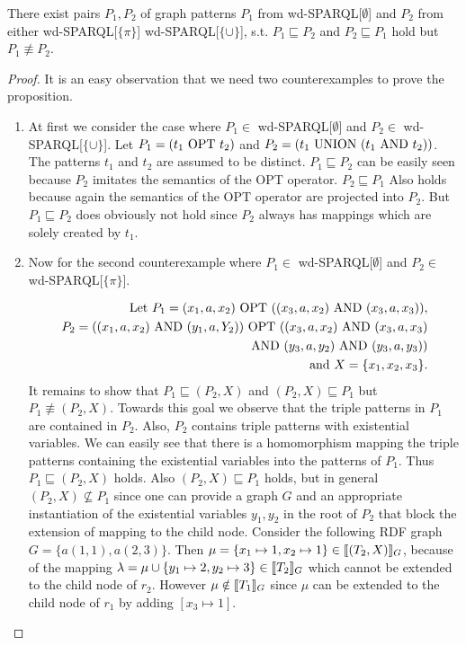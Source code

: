 \begin{proposition}
	There exist pairs $P_1,P_2$ of graph patterns $P_1$ from
	wd-SPARQL[$\emptyset$] and $P_2$ from either wd-SPARQL[$\{\pi\}$]
	wd-SPARQL[$\{\cup\}$], s.t. $P_1 \sqsubseteq P_2$ and $P_2 \sqsubseteq P_1$
	hold but $P_1 \not\equiv P_2$.
\end{proposition}

\begin{proof}
	It is an easy observation that we need two counterexamples to prove the
	proposition. 
	\begin{enumerate}	
		\item At first we consider the case where  $P_1 \in$
			wd-SPARQL[$\emptyset$] and  $P_2 \in$ wd-SPARQL[$\{\cup\}$]. Let
			$P_1 = (t_1 \mbox{ OPT } t_2)$ and $P_2 = (t_1 \mbox{ UNION } (t_1 \mbox{ AND } t_2))$. The patterns $t_1$ and $t_2$
			are assumed to be distinct.
			$P_1 \sqsubseteq P_2$ can be easily seen because $P_2$ imitates
			the semantics of the OPT operator. $P_2 \sqsubseteq P_1$ Also holds because again the
			semantics of the OPT operator are projected into $P_2$. But $P_1 \sqsubseteq P_2$ does
			obviously not hold since $P_2$ always has mappings which are solely created by
			$t_1$.		\item Now for the second counterexample where  $P_1 \in$
			wd-SPARQL[$\emptyset$] and  $P_2 \in$ wd-SPARQL[$\{\pi\}$]. 

			\begin{align*}
				\mbox{Let } P_1 = (x_1,a,x_2) \mbox{ OPT } ((x_3,a,x_2) \mbox{ AND } (x_3,a,x_3)),\\
			P_2 = ((x_1,a,x_2) \mbox{ AND } (y_1,a,Y_2)) \mbox{ OPT } ((x_3,a,x_2) \mbox{ AND }
			(x_3,a,x_3)\\ 
			\mbox{ AND } (y_3,a,y_2) \mbox{ AND } (y_3,a,y_3))\\
			\mbox{ and } X = \{x_1,x_2,x_3\}.
			\end{align*}
			It remains to show that $P_1 \sqsubseteq (P_2,X)$ and $(P_2,X)
			\sqsubseteq P_1$ but $P_1 \not\equiv (P_2,X)$.
		    Towards this goal we observe that the triple patterns in $P_1$ are
			contained in $P_2$. Also, $P_2$ contains triple patterns with
			existential variables. We can easily see that there is a
			homomorphism mapping the triple patterns containing the existential
			variables into the
			patterns of $P_1$. Thus $P_1 \sqsubseteq (P_2,X)$ holds. Also
			$(P_2,X) \sqsubseteq P_1$ holds, but in general $(P_2,X) \not\subseteq
			P_1$ since one can provide a graph $G$ and an appropriate
			instantiation of the existential variables $y_1, y_2$ in the root
			of $P_2$ that block the extension of mapping to the child node.
			Consider the following RDF graph $G = \{ a(1,1), a(2,3)\}$. Then
			$\mu = \{x_1 \mapsto 1, x_2 \mapsto 1\} \in \llbracket (T_2,X)\rrbracket_G$,
			because of the mapping $\lambda = \mu \cup \{ y_1 \mapsto 2,
			y_2\mapsto 3 \} \in \llbracket T_2 \rrbracket_G$ which cannot be extended to the
			child node of $r_2$. However $\mu \notin \llbracket T_1\rrbracket_G$ since $\mu$
			can be extended to the child node of $r_1$ by adding $[x_3 \mapsto 1]$.\qedhere
	\end{enumerate}
\end{proof}

